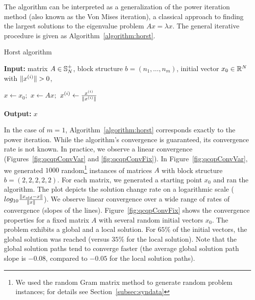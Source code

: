 The algorithm can be interpreted as a generalization of the power
iteration method (also known as the Von Mises iteration), a classical
approach to finding the largest solutions to the eigenvalue problem $A
x = \lambda x$.  The general iterative procedure is given as Algorithm~\ref{algorithm:horst}.
\begin{algorithm}
\caption{Horst algorithm}
\label{algorithm:horst}
{\bf Input:} matrix $A \in \mathbb{S}_N^+$, block structure $b = \left(n_1,\ldots,n_m\right)$, initial vector $x_0 \in \mathbb{R}^N$ with $\lVert x^{(i)}\rVert > 0$,  \par
\begin{algorithmic}
\STATE $x \leftarrow x_0;$
\STATE $x \leftarrow A x;$
\STATE $x^{(i)} \leftarrow \frac{x^{(i)}}{\lVert x^{(i)}\rVert}$
\ENDFOR
\ENDFOR
\end{algorithmic}
{\bf Output:} $x$
\end{algorithm}
In the case of $m=1$,  Algorithm~\ref{algorithm:horst}
corresponds exactly to the power iteration. While the algorithm's
convergence is guaranteed, its convergence rate is not known. In
practice, we observe a linear convergence (Figures~\ref{fig:qcqpConvVar}
and \ref{fig:qcqpConvFix}). In Figure~\ref{fig:qcqpConvVar}, we
generated $1000$ random\footnote{We used the random Gram matrix method
  to generate random problem instances; for details see
  Section~\ref{subsec:syndata}} instances of matrices $A$ with block
structure $b = \left(2,2,2,2,2\right)$. For each matrix, we generated
a starting point $x_0$ and ran the algorithm. The plot depicts the
solution change rate on a logarithmic scale ($log_{10}
\frac{\lVert x_{old} - x\rVert}{\lVert x\rVert}$). We observe linear convergence
over a wide range of rates of convergence (slopes of the
lines). Figure~\ref{fig:qcqpConvFix} shows the convergence properties
for a fixed matrix $A$ with several random initial vectors $x_0$. The
problem exhibits a global
and a local solution. For $65\%$ of the initial vectors, the global solution was reached (versus $35\%$ for the local solution). Note that the global
solution paths tend to converge faster (the average global solution path slope is  $-0.08$, compared  to $-0.05$ for the local solution paths).


